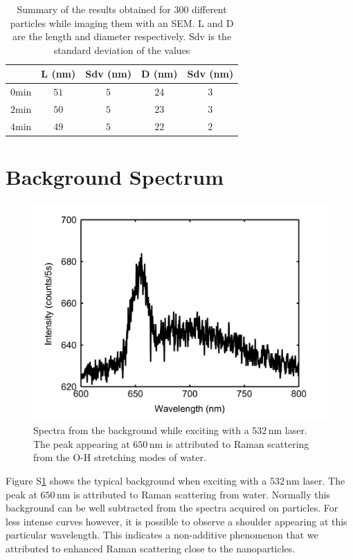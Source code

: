 \documentclass[journal=jpccck]{achemso}
\newcommand{\nm}{\ensuremath{\,\textrm{nm}}}
\begin{document}
\begin{table}[htp]
\begin{tabular*}{0.48\textwidth}{c c c c c}
 $\,$ & L (nm) & Sdv (nm) & D (nm) & Sdv (nm) \\\hline
 $0\textrm{min}$ & $51$ & $5$ & $24$ & $3$ \\
 $2\textrm{min}$ & $50$ & $5$ & $23$ & $3$ \\
 $4\textrm{min}$ & $49$ & $5$ & $22$ & $2$ \\
\end{tabular*}
\label{tab:SEM_results}
\caption{Summary of the results obtained for 300 different particles while
imaging them with an SEM. L and D are the length and diameter respectively.
Sdv is the standard deviation of the values}
\end{table}

\section{Background Spectrum}
\begin{figure}[htp]
 \centering
 \includegraphics[width=0.95\linewidth]{Figures/04_Supporting/03_Background/background.png}
 \caption{Spectra from the background while exciting with a $532\nm$ laser. The
 peak appearing at $650\nm$ is attributed to Raman scattering from the O-H stretching modes of water.}
 \label{fig:Background}
\end{figure}

Figure S\ref{fig:Background} shows the typical background when exciting with a
$532\nm$ laser. The peak at $650\nm$ is attributed to Raman scattering from
water. Normally this background can be well subtracted from the spectra acquired
on particles. For less intense curves however, it is possible to observe a
shoulder appearing at this particular wavelength. This indicates a non-additive
phenomenon that we attributed to enhanced Raman scattering close to the
nanoparticles.
\end{document}
